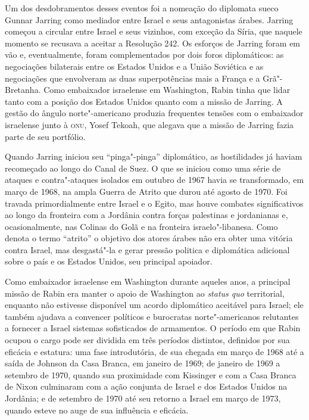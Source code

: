 Um dos desdobramentos desses eventos foi a nomeação do diplomata sueco
Gunnar Jarring como mediador entre Israel e seus antagonistas árabes.
Jarring começou a circular entre Israel e seus vizinhos, com exceção da
Síria, que naquele momento se recusava a aceitar a Resolução 242. Os
esforços de Jarring foram em vão e, eventualmente, foram complementados
por dois foros diplomáticos: as negociações bilaterais entre os Estados
Unidos e a União Soviética e as negociações que envolveram as duas
superpotências mais a França e a Grã"-Bretanha. Como embaixador
israelense em Washington, Rabin tinha que lidar tanto com a posição dos
Estados Unidos quanto com a missão de Jarring. A gestão do ângulo norte"-americano
produzia frequentes tensões com o embaixador israelense junto à \textsc{onu},
Yosef Tekoah, que alegava que a missão de Jarring fazia parte de seu
portfólio.

Quando Jarring iniciou seu ``pinga"-pinga'' diplomático, as hostilidades
já haviam recomeçado ao longo do Canal de Suez. O que se iniciou como
uma série de ataques e contra"-ataques isolados em outubro de 1967 havia
se transformado, em março de 1968, na ampla Guerra de Atrito que
durou até agosto de 1970. Foi travada primordialmente entre Israel e o
Egito, mas houve combates significativos ao longo da fronteira com a
Jordânia contra forças palestinas e jordanianas e, ocasionalmente, nas
Colinas do Golã e na fronteira israelo"-libanesa. Como denota o termo
``atrito'' o objetivo dos atores árabes não era obter uma vitória contra
Israel, mas desgastá"-la e gerar pressão politica e diplomática adicional
sobre o país e os Estados Unidos, seu principal apoiador.

Como embaixador israelense em Washington durante aqueles anos, a
principal missão de Rabin era manter o apoio de Washington ao
\textit{status quo} territorial, enquanto não estivesse disponível um
acordo diplomático aceitável para Israel; ele também ajudava a convencer
políticos e burocratas norte"-americanos relutantes a fornecer a Israel
sistemas sofisticados de armamentos. O período em que Rabin ocupou o cargo pode ser
dividida em três períodos distintos, definidos por sua eficácia e
estatura: uma fase introdutória, de sua chegada em março de 1968 até a
saída de Johnson da Casa Branca, em janeiro de 1969; de janeiro de 1969 a
setembro de 1970, quando sua proximidade com Kissinger e com a Casa
Branca de Nixon culminaram com a ação conjunta de Israel e dos Estados Unidos na
Jordânia; e de setembro de 1970 até seu retorno a Israel em março de
1973, quando esteve no auge de sua influência e eficácia.

